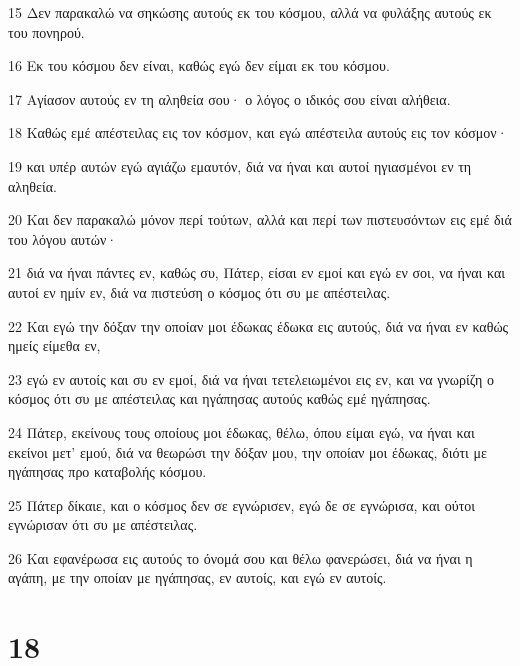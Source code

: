 \par 15 Δεν παρακαλώ να σηκώσης αυτούς εκ του κόσμου, αλλά να φυλάξης αυτούς εκ του πονηρού.
\par 16 Εκ του κόσμου δεν είναι, καθώς εγώ δεν είμαι εκ του κόσμου.
\par 17 Αγίασον αυτούς εν τη αληθεία σου· ο λόγος ο ιδικός σου είναι αλήθεια.
\par 18 Καθώς εμέ απέστειλας εις τον κόσμον, και εγώ απέστειλα αυτούς εις τον κόσμον·
\par 19 και υπέρ αυτών εγώ αγιάζω εμαυτόν, διά να ήναι και αυτοί ηγιασμένοι εν τη αληθεία.
\par 20 Και δεν παρακαλώ μόνον περί τούτων, αλλά και περί των πιστευσόντων εις εμέ διά του λόγου αυτών·
\par 21 διά να ήναι πάντες εν, καθώς συ, Πάτερ, είσαι εν εμοί και εγώ εν σοι, να ήναι και αυτοί εν ημίν εν, διά να πιστεύση ο κόσμος ότι συ με απέστειλας.
\par 22 Και εγώ την δόξαν την οποίαν μοι έδωκας έδωκα εις αυτούς, διά να ήναι εν καθώς ημείς είμεθα εν,
\par 23 εγώ εν αυτοίς και συ εν εμοί, διά να ήναι τετελειωμένοι εις εν, και να γνωρίζη ο κόσμος ότι συ με απέστειλας και ηγάπησας αυτούς καθώς εμέ ηγάπησας.
\par 24 Πάτερ, εκείνους τους οποίους μοι έδωκας, θέλω, όπου είμαι εγώ, να ήναι και εκείνοι μετ' εμού, διά να θεωρώσι την δόξαν μου, την οποίαν μοι έδωκας, διότι με ηγάπησας προ καταβολής κόσμου.
\par 25 Πάτερ δίκαιε, και ο κόσμος δεν σε εγνώρισεν, εγώ δε σε εγνώρισα, και ούτοι εγνώρισαν ότι συ με απέστειλας.
\par 26 Και εφανέρωσα εις αυτούς το όνομά σου και θέλω φανερώσει, διά να ήναι η αγάπη, με την οποίαν με ηγάπησας, εν αυτοίς, και εγώ εν αυτοίς.

\chapter{18}

